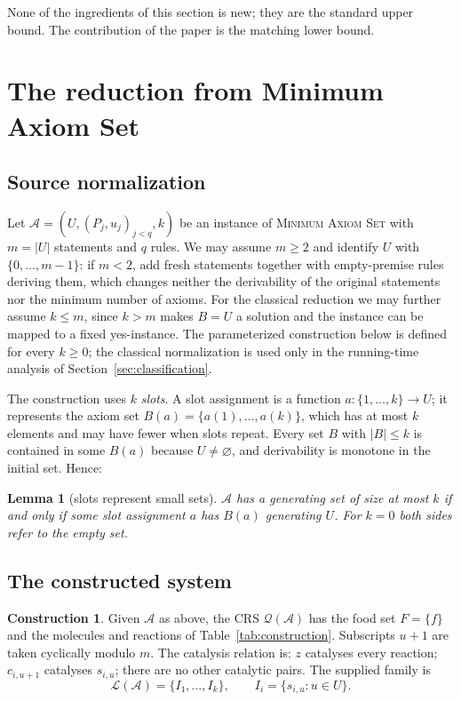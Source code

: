 \documentclass[11pt,a4paper]{article}
\theoremstyle{plain}
\newtheorem{lemma}[theorem]{Lemma}
\theoremstyle{definition}
\newtheorem{construction}[theorem]{Construction}
\theoremstyle{remark}
\newcommand{\MAS}{\textup{\textsc{Minimum Axiom Set}}}
\newcommand{\cL}{\mathcal{L}}
\newcommand{\cA}{\mathcal{A}}
\newcommand{\cQ}{\mathcal{Q}}
\begin{document}
None of the ingredients of this section is new; they are the standard upper bound. The contribution of the paper is the matching lower bound.

\section{The reduction from Minimum Axiom Set}\label{sec:construction}

\subsection{Source normalization}\label{sec:source-norm}

Let $\cA=(U,(P_j,u_j)_{j<q},k)$ be an instance of \MAS{} with $m=|U|$ statements and $q$ rules. We may assume $m\ge2$ and identify $U$ with $\{0,\dots,m-1\}$: if $m<2$, add fresh statements together with empty-premise rules deriving them, which changes neither the derivability of the original statements nor the minimum number of axioms. For the classical reduction we may further assume $k\le m$, since $k>m$ makes $B=U$ a solution and the instance can be mapped to a fixed yes-instance. The parameterized construction below is defined for every $k\ge0$; the classical normalization is used only in the running-time analysis of Section~\ref{sec:classification}.

The construction uses $k$ \emph{slots}. A slot assignment is a function $a\colon\{1,\dots,k\}\to U$; it represents the axiom set $B(a)=\{a(1),\dots,a(k)\}$, which has at most $k$ elements and may have fewer when slots repeat. Every set $B$ with $|B|\le k$ is contained in some $B(a)$ because $U\ne\varnothing$, and derivability is monotone in the initial set. Hence:

\begin{lemma}[slots represent small sets]\label{lem:slots}
$\cA$ has a generating set of size at most $k$ if and only if some slot assignment $a$ has $B(a)$ generating $U$. For $k=0$ both sides refer to the empty set.
\end{lemma}

\subsection{The constructed system}\label{sec:target}

\begin{construction}\label{con:axiom}
Given $\cA$ as above, the CRS $\cQ(\cA)$ has the food set $F=\{f\}$ and the molecules and reactions of Table~\ref{tab:construction}. Subscripts $u+1$ are taken cyclically modulo $m$. The catalysis relation is: $z$ catalyses every reaction; $c_{i,u+1}$ catalyses $s_{i,u}$; there are no other catalytic pairs. The supplied family is
\[
\cL(\cA)=\{I_1,\dots,I_k\},\qquad I_i=\{s_{i,u}: u\in U\}.
\]
\end{construction}
\end{document}

